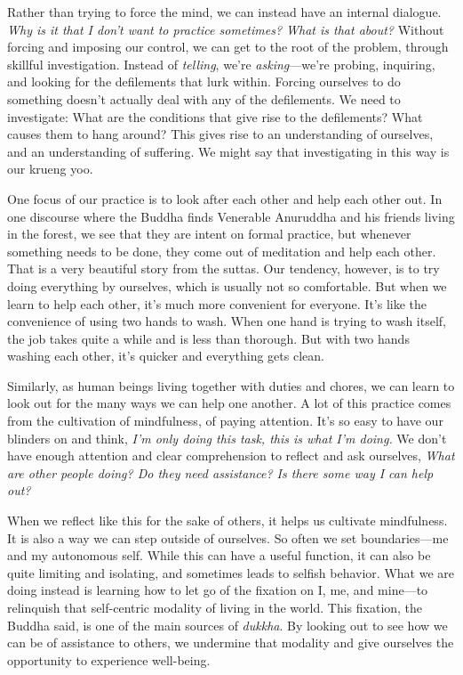Rather than trying to force the mind, we can instead have an internal 
dialogue. \emph{Why is it that I don't want to practice sometimes? What 
is that about?} Without forcing and imposing our control, we can get to 
the root of the problem, through skillful investigation. Instead of 
\emph{telling}, we're \emph{asking}---we're probing, inquiring, and 
looking for the defilements that lurk within. Forcing ourselves to do 
something doesn't actually deal with any of the defilements. We need to 
investigate: What are the conditions that give rise to the defilements? 
What causes them to hang around? This gives rise to an understanding of 
ourselves, and an understanding of suffering. We might say that 
investigating in this way is our krueng yoo.


One focus of our practice is to look after each other and help each 
other out. In one discourse where the Buddha finds Venerable Anuruddha 
and his friends living in the forest, we see that they are intent on 
formal practice, but whenever something needs to be done, they come out 
of meditation and help each other. That is a very beautiful story from 
the suttas. Our tendency, however, is to try doing everything by 
ourselves, which is usually not so comfortable. But when we learn to 
help each other, it's much more convenient for everyone. It's like the 
convenience of using two hands to wash. When one hand is trying to wash 
itself, the job takes quite a while and is less than thorough. But with 
two hands washing each other, it's quicker and everything gets clean.

Similarly, as human beings living together with duties and chores, we 
can learn to look out for the many ways we can help one another. A lot 
of this practice comes from the cultivation of mindfulness, of paying 
attention. It's so easy to have our blinders on and think, \emph{I'm 
only doing this task, this is what I'm doing.} We don't have enough 
attention and clear comprehension to reflect and ask ourselves, 
\emph{What are other people doing? Do they need assistance? Is there 
some way I can help out?}

When we reflect like this for the sake of others, it helps us cultivate 
mindfulness. It is also a way we can step outside of ourselves. So 
often we set boundaries---me and my autonomous self. While this can 
have a useful function, it can also be quite limiting and isolating, 
and sometimes leads to selfish behavior. What we are doing instead is 
learning how to let go of the fixation on I, me, and mine---to 
relinquish that self-centric modality of living in the world. This 
fixation, the Buddha said, is one of the main sources of \emph{dukkha}. 
By looking out to see how we can be of assistance to others, we 
undermine that modality and give ourselves the opportunity to 
experience well-being.

